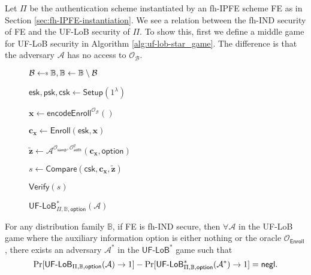 Let $\Pi$ be the authentication scheme instantiated by an fh-IPFE scheme \textsf{FE} as in Section \ref{sec:fh-IPFE-instantiation}.
We see a relation between the fh-IND security of \textsf{FE} and the UF-LoB security of $\Pi$.
To show this, first we define a middle game for UF-LoB security in Algorithm \ref{alg:uf-lob-star_game}. The difference is that the adversary $\mathcal{A}$ has no access to $\mathcal{O}_\mathcal{B}$.

\begin{figure}[h]
\centering
	
	\begin{minipage}[t]{0.5\linewidth}
	\centering
	\begin{algorithm}[H]
	\caption{$\textsf{UF-LoB}^*_{\Pi, \mathbb{B}, \textsf{option}}(\mathcal{A})$}
	\label{alg:uf-lob-star_game}
	\begin{algorithmic}[1]
		\State $\mathcal{B} \getsdollar \mathbb{B}, \mathbb{B} \gets \mathbb{B} \setminus \mathcal{B}$

		\State $\textsf{esk}, \textsf{psk}, \textsf{csk} \gets \textsf{Setup}(1^\lambda)$

		\State $\mathbf{x} \gets \textsf{encodeEnroll}^{\mathcal{O}_{\mathcal{B}}}()$

		\State $\mathbf{c_x} \gets \textsf{Enroll}(\textsf{esk}, \mathbf{x})$

		\State ${\mathbf{\tilde{z}}} \gets \mathcal{A}^{\mathcal{O}_\textsf{samp}, \mathcal{O}_\textsf{auth}^q } ( \mathbf{c_x}, \textsf{option})$

		\State $s \gets \textsf{Compare}( \textsf{csk}, \mathbf{c_x}, \mathbf{\tilde{z}} )$

		\State \Return $\textsf{Verify}(s)$
	\end{algorithmic}
	\end{algorithm}
	\end{minipage}
	
\label{fig:uf-lob-star_game}
\end{figure}


\begin{theorem}
\label{thm:ind-uf-lob1}

	For any distribution family $\mathbb{B}$, if \textsf{FE} is fh-IND secure, then $\forall \mathcal{A}$ in the \textsf{UF-LoB} game where the auxiliary information \textsf{option} is either nothing or the oracle $\mathcal{O}_{\textsf{Enroll}}$, there exists an adversary $\mathcal{A}^*$ in the $\textsf{UF-LoB}^*$ game such that
	\[
		\Pr[\textsf{UF-LoB}_{\Pi, \mathbb{B}, \textsf{option}}(\mathcal{A}) \to 1] - \Pr[\textsf{UF-LoB}^*_{\Pi, \mathbb{B}, \textsf{option}}(\mathcal{A}^*) \to 1] = \mathsf{negl}.
	\]

\end{theorem}


